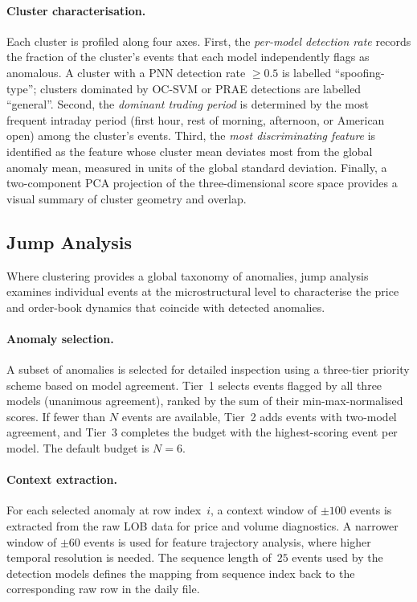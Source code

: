 \documentclass[11pt]{report}
\begin{document}
\paragraph{Cluster characterisation.}
Each cluster is profiled along four axes. First, the \emph{per-model detection rate} records the fraction of the cluster's events that each model independently flags as anomalous. A cluster with a PNN detection rate $\geq 0.5$ is labelled ``spoofing-type''; clusters dominated by OC-SVM or PRAE detections are labelled ``general''. Second, the \emph{dominant trading period} is determined by the most frequent intraday period (first hour, rest of morning, afternoon, or American open) among the cluster's events. Third, the \emph{most discriminating feature} is identified as the feature whose cluster mean deviates most from the global anomaly mean, measured in units of the global standard deviation. Finally, a two-component PCA projection of the three-dimensional score space provides a visual summary of cluster geometry and overlap.

\subsection{Jump Analysis}\label{sec:methodology:posthoc:jumps}

Where clustering provides a global taxonomy of anomalies, jump analysis examines individual events at the microstructural level to characterise the price and order-book dynamics that coincide with detected anomalies.

\paragraph{Anomaly selection.}
A subset of anomalies is selected for detailed inspection using a three-tier priority scheme based on model agreement. Tier~1 selects events flagged by all three models (unanimous agreement), ranked by the sum of their min-max-normalised scores. If fewer than $N$ events are available, Tier~2 adds events with two-model agreement, and Tier~3 completes the budget with the highest-scoring event per model. The default budget is $N = 6$.

\paragraph{Context extraction.}
For each selected anomaly at row index~$i$, a context window of $\pm 100$ events is extracted from the raw LOB data for price and volume diagnostics. A narrower window of $\pm 60$ events is used for feature trajectory analysis, where higher temporal resolution is needed. The sequence length of~$25$ events used by the detection models defines the mapping from sequence index back to the corresponding raw row in the daily file.
\end{document}
